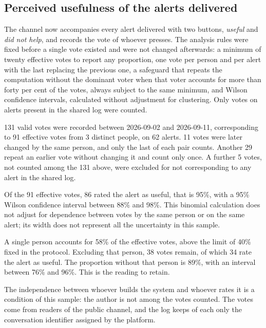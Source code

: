 \subsection{Perceived usefulness of the alerts delivered}
\label{sec:av_feedback}

The channel now accompanies every alert delivered with two buttons, \emph{useful} and \emph{did not help}, and records the vote of whoever presses. The analysis rules were fixed before a single vote existed and were not changed afterwards: a minimum of twenty effective votes to report any proportion, one vote per person and per alert with the last replacing the previous one, a safeguard that repeats the computation without the dominant voter when that voter accounts for more than forty per cent of the votes, always subject to the same minimum, and Wilson confidence intervals, calculated without adjustment for clustering.
Only votes on alerts present in the shared log were counted.

131 valid votes were recorded between 2026-09-02 and 2026-09-11, corresponding to 91 effective votes from 3 distinct people, on 62 alerts. 11 votes were later changed by the same person, and only the last of each pair counts. Another 29 repeat an earlier vote without changing it and count only once. A further 5 votes, not counted among the 131 above, were excluded for not corresponding to any alert in the shared log.

Of the 91 effective votes, 86 rated the alert as useful, that is 95\%, with a 95\% Wilson confidence interval between 88\% and 98\%. This binomial calculation does not adjust for dependence between votes by the same person or on the same alert; its width does not represent all the uncertainty in this sample.

A single person accounts for 58\% of the effective votes, above the limit of 40\% fixed in the protocol. Excluding that person, 38 votes remain, of which 34 rate the alert as useful.
The proportion without that person is 89\%, with an interval between 76\% and 96\%. This is the reading to retain.

The independence between whoever builds the system and whoever rates it is a condition of this sample: the author is not among the votes counted. The votes come from readers of the public channel, and the log keeps of each only the conversation identifier assigned by the platform.

